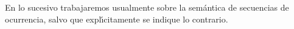 En lo sucesivo trabajaremos usualmente sobre la sem\'{a}ntica de
secuencias de ocurrencia, salvo que expl\'{\i}citamente se
indique lo contrario.


%
%
%

%
%

